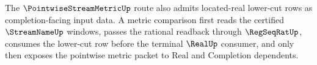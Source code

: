 The $\PointwiseStreamMetricUp$ route also admits located-real lower-cut rows as completion-facing input data. A metric comparison first reads the certified $\StreamNameUp$ windows, passes the rational readback through $\RegSeqRatUp$, consumes the lower-cut row before the terminal $\RealUp$ consumer, and only then exposes the pointwise metric packet to Real and Completion dependents.
